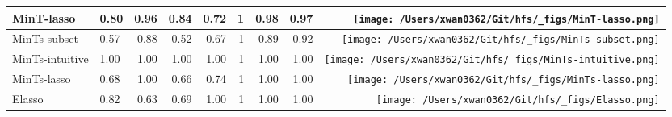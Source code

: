\documentclass[
  letterpaper,
  DIV=11,
  numbers=noendperiod]{scrartcl}
\begin{document}
\begin{table}[!h]
{\begin{tabular}{llrrrrrr>{}r}
MinT-lasso & 0.80 & 0.96 & 0.84 & 0.72 & 1 & 0.98 & 0.97 & \texttt{[image: /Users/xwan0362/Git/hfs/\_figs/MinT-lasso.png]}\\
\midrule
MinTs-subset & 0.57 & 0.88 & 0.52 & 0.67 & 1 & 0.89 & 0.92 & \texttt{[image: /Users/xwan0362/Git/hfs/\_figs/MinTs-subset.png]}\\
MinTs-intuitive & 1.00 & 1.00 & 1.00 & 1.00 & 1 & 1.00 & 1.00 & \texttt{[image: /Users/xwan0362/Git/hfs/\_figs/MinTs-intuitive.png]}\\
MinTs-lasso & 0.68 & 1.00 & 0.66 & 0.74 & 1 & 1.00 & 1.00 & \texttt{[image: /Users/xwan0362/Git/hfs/\_figs/MinTs-lasso.png]}\\
\midrule
Elasso & 0.82 & 0.63 & 0.69 & 1.00 & 1 & 1.00 & 1.00 & \texttt{[image: /Users/xwan0362/Git/hfs/\_figs/Elasso.png]}\\
\bottomrule
\end{tabular}}
\end{table}
\end{document}
